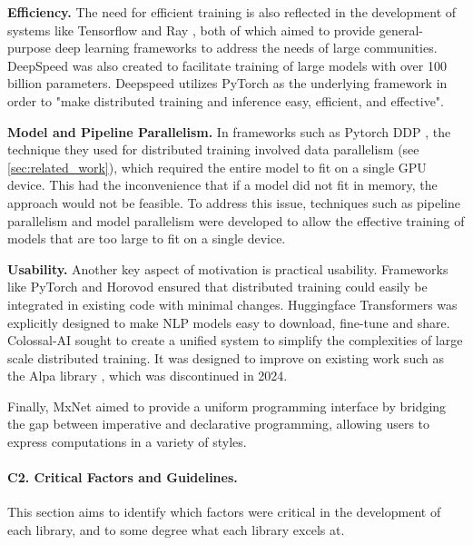 \textbf{Efficiency.}
The need for efficient training is also reflected in the development of systems like Tensorflow
\cite{abadi_tensorflow_2016} and Ray \cite{moritz_ray_2018}, both of which aimed to provide
general-purpose deep learning frameworks to address the needs of large communities. DeepSpeed
\cite{rasley_deepspeed_2020} was also created to facilitate training of large models with over 100
billion parameters. Deepspeed utilizes PyTorch \cite{noauthor_pytorchpytorch_nodate} as the
underlying framework in order to "make distributed training and inference easy, efficient, and
effective".

\textbf{Model and Pipeline Parallelism.}
In frameworks such as Pytorch DDP \cite{li_pytorch_2020}, the technique they used for distributed
training involved data parallelism (see \ref{sec:related_work}), which required the entire model to
fit on a single GPU device. This had the inconvenience that if a model did not fit in memory, the
approach would not be feasible. To address this issue, techniques such as pipeline parallelism
\cite{huang_gpipe_2019} and model parallelism \cite{shoeybi_megatron-lm_2020} were developed to
allow the effective training of models that are too large to fit on a single device.

\textbf{Usability.}
Another key aspect of motivation is practical usability. Frameworks like PyTorch \cite{li_pytorch_2020}
and Horovod \cite{sergeev_horovod_2018} ensured that distributed training could easily be integrated
in existing code with minimal changes. Huggingface Transformers \cite{wolf_huggingfaces_2020} was
explicitly designed to make NLP models easy to download, fine-tune and share. Colossal-AI
\cite{li_colossal-ai_2023} sought to create a unified system to simplify the complexities of
large scale distributed training. It was designed to improve on existing work such as the Alpa library
\cite{noauthor_alpa-projectsalpa_nodate}, which was discontinued in 2024.

Finally, MxNet \cite{chen_mxnet_2015} aimed to provide a uniform programming interface by bridging
the gap between imperative and declarative programming, allowing users to express computations in a
variety of styles.

\paragraph{C2. Critical Factors and Guidelines.}
This section aims to identify which factors were critical in the development of each library, and
to some degree what each library excels at.

